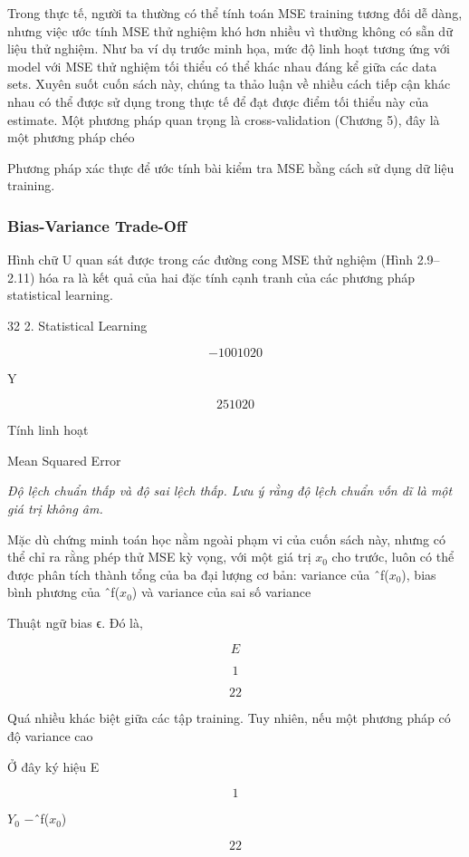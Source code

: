 Trong thực tế, người ta thường có thể tính toán MSE training tương đối dễ dàng, nhưng việc ước tính MSE thử nghiệm khó hơn nhiều vì thường không có sẵn dữ liệu thử nghiệm. Như ba ví dụ trước minh họa, mức độ linh hoạt tương ứng với model với MSE thử nghiệm tối thiểu có thể khác nhau đáng kể giữa các data sets. Xuyên suốt cuốn sách này, chúng ta thảo luận về nhiều cách tiếp cận khác nhau có thể được sử dụng trong thực tế để đạt được điểm tối thiểu này của estimate. Một phương pháp quan trọng là cross-validation (Chương 5), đây là một phương pháp chéo

Phương pháp xác thực để ước tính bài kiểm tra MSE bằng cách sử dụng dữ liệu training.

\subsubsection{Bias-Variance Trade-Off}

Hình chữ U quan sát được trong các đường cong MSE thử nghiệm (Hình 2.9–2.11) hóa ra là kết quả của hai đặc tính cạnh tranh của các phương pháp statistical learning.

32 2. Statistical Learning

\[-10 0 10 20\]

Y

\[2 5 10 20\]

Tính linh hoạt

Mean Squared Error

\noindent\textit{Độ lệch chuẩn thấp và độ sai lệch thấp. Lưu ý rằng độ lệch chuẩn vốn dĩ là một giá trị không âm.}

Mặc dù chứng minh toán học nằm ngoài phạm vi của cuốn sách này, nhưng có thể chỉ ra rằng phép thử MSE kỳ vọng, với một giá trị $x_{0}$ cho trước, luôn có thể được phân tích thành tổng của ba đại lượng cơ bản: variance của ˆf($x_{0}$), bias bình phương của ˆf($x_{0}$) và variance của sai số variance

Thuật ngữ bias ϵ. Đó là,

\[E\]

\[1\]

\[22\]

Quá nhiều khác biệt giữa các tập training. Tuy nhiên, nếu một phương pháp có độ variance cao

Ở đây ký hiệu E

\[1\]

$Y_{0}$ −ˆf($x_{0}$)

\[22\]

